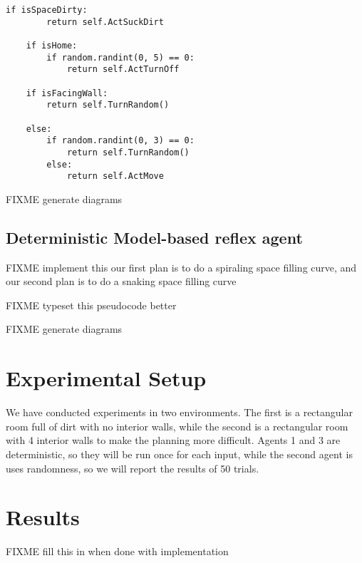 \documentclass{article}
\begin{document}
\begin{lstlisting}[frame=single]
	if isSpaceDirty:
		return self.ActSuckDirt

	if isHome:
		if random.randint(0, 5) == 0:
			return self.ActTurnOff

	if isFacingWall:
		return self.TurnRandom()

	else:
		if random.randint(0, 3) == 0:
			return self.TurnRandom()
		else:
			return self.ActMove
\end{lstlisting}
FIXME generate diagrams


\subsection{Deterministic Model-based reflex agent}
FIXME implement this
our first plan is to do a spiraling space filling curve, and our second plan is to do a snaking space filling curve


FIXME typeset this pseudocode better



FIXME generate diagrams





\section{Experimental Setup}
We have conducted experiments in two environments.
The first is a rectangular room full of dirt with no interior walls, while the second is a rectangular room with 4 interior walls to make the planning more difficult.
Agents 1 and 3 are deterministic, so they will be run once for each input, while the second agent is uses randomness, so we will report the results of 50 trials.

\section{Results}
FIXME fill this in when done with implementation
\end{document}
